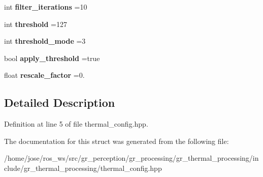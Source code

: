 \begin{DoxyCompactItemize}
int {\bfseries filter\+\_\+iterations} =10
\item 
\mbox{\label{structgr__thermal__processing_1_1ThermalFilterConfig_a2bcd00fd6e24930d693cac49740b04c8}} 
int {\bfseries threshold} =127
\item 
\mbox{\label{structgr__thermal__processing_1_1ThermalFilterConfig_a23edfd4ac5acef2f2ccef12692e05c2e}} 
int {\bfseries threshold\+\_\+mode} =3
\item 
\mbox{\label{structgr__thermal__processing_1_1ThermalFilterConfig_a66ae8ba024a7e138b62a33295715e025}} 
bool {\bfseries apply\+\_\+threshold} =true
\item 
\mbox{\label{structgr__thermal__processing_1_1ThermalFilterConfig_a4f9da74f534d7fe8526a11995cea9a0b}} 
float {\bfseries rescale\+\_\+factor} =0.
\end{DoxyCompactItemize}


\subsection{Detailed Description}


Definition at line 5 of file thermal\+\_\+config.\+hpp.



The documentation for this struct was generated from the following file\+:\begin{DoxyCompactItemize}
\item 
/home/jose/ros\+\_\+ws/src/gr\+\_\+perception/gr\+\_\+processing/gr\+\_\+thermal\+\_\+processing/include/gr\+\_\+thermal\+\_\+processing/thermal\+\_\+config.\+hpp\end{DoxyCompactItemize}

